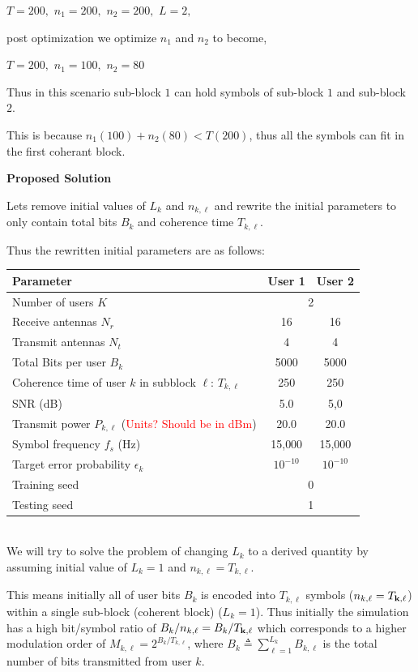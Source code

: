 \documentclass[a4paper, 12pt, onecolumn, journal, twoside, draftclsnofoot]{IEEEtran}
\begin{document}
$T = 200,$
$n_1 = 200,$
$n_2 = 200,$
$L = 2,$

post optimization we optimize $n_1$ and $n_2$ to become,

$T=200,$
$n_1 = 100,$
$n_2 = 80$

Thus in this scenario sub-block $1$ can hold symbols of sub-block $1$ and sub-block $2$.

This is because $n_1(100) + n_2(80) < T(200)$, thus all the symbols can fit in the first coherant block.

\newpage

\textbf{Proposed Solution}

Lets remove initial values of $L_k$ and $n_{k,\ell}$ and rewrite the initial parameters to only contain total bits $B_k$ and coherence time $T_{k,\ell}$.

Thus the rewritten initial parameters are as follows:

\begin{tabular}{|l|c|c|}
\hline
\textbf{Parameter} & \textbf{User 1} & \textbf{User 2} \\
\hline
Number of users $K$ & \multicolumn{2}{c|}{2} \\
\hline
Receive antennas $N_r$ & 16 & 16 \\
Transmit antennas $N_t$ & 4 & 4 \\
\hline
Total Bits per user $B_k$ & 5000 & 5000 \\
\hline
Coherence time of user $k$ in subblock $\ell$: $T_{k,\ell}$ & 250 & 250 \\
\hline
SNR (dB) & 5.0 & 5,0 \\
Transmit power $P_{k,\ell}$ (\textcolor{red}{Units?  Should be in dBm}) & 20.0 & 20.0 \\
\hline
Symbol frequency $f_s$ (Hz) & 15{,}000 & 15{,}000 \\
Target error probability $\epsilon_k$ & $10^{-10}$ & $10^{-10}$ \\
\hline
Training seed & \multicolumn{2}{c|}{0} \\
Testing seed & \multicolumn{2}{c|}{1} \\
\hline 
\end{tabular} \\

We will try to solve the problem of changing $L_k$ to a derived quantity by assuming initial value of $L_k = 1$ and $n_{k,\ell} = T_{k,\ell}$.

This means initially all of user bits $B_k$ is encoded into $T_{k,\ell}$ symbols ($n_{k,\ell} = T_{{\bf k},\ell}$) within a single sub-block (coherent block) ($L_k = 1$).
Thus initially the simulation has a high bit/symbol ratio of $B_k/n_{k,\ell} = B_k/T_{{\bf k},\ell}$ which corresponds to a higher modulation order of $M_{k, \ell} = 2^{B_k/T_{k,\ell}}$, where $\displaystyle B_k \triangleq \sum_{\ell=1}^{L_k} B_{k,\ell}$ is the total number of bits transmitted from user $k$. 
\end{document}
